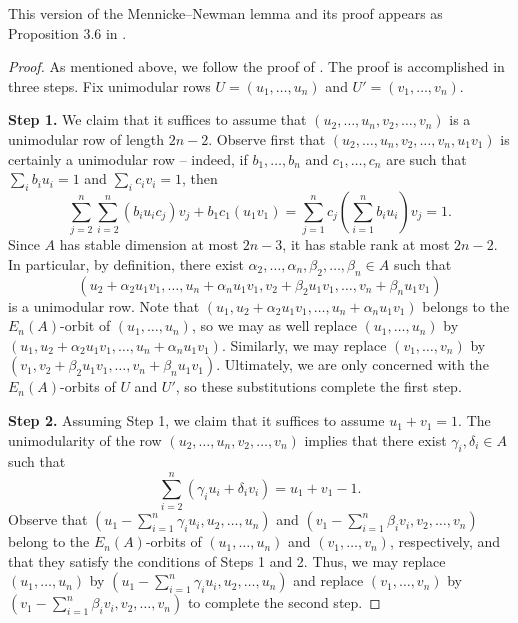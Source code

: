 This version of the Mennicke--Newman lemma and its proof appears as Proposition 3.6 in \cite{LERBET2024109415}.

\begin{proof}
    As mentioned above, we follow the proof of \cite[Proposition 3.6]{LERBET2024109415}. The proof is accomplished in three steps. Fix unimodular rows $U = (u_1,\ldots,u_n)$ and $U' = (v_1,\ldots,v_n)$.

    \textbf{Step 1.} We claim that it suffices to assume that $(u_2,\ldots,u_n,v_2,\ldots,v_n)$ is a unimodular row of length $2n-2$. Observe first that $(u_2,\ldots,u_n,v_2,\ldots,v_n, u_1v_1)$ is certainly a unimodular row -- indeed, if $b_1,\ldots,b_n$ and $c_1,\ldots,c_n$ are such that $\sum_i b_iu_i = 1$ and $\sum_i c_iv_i = 1$, then \[\sum_{j=2}^n \sum_{i=2}^n (b_iu_ic_j)v_j + b_1c_1(u_1v_1)= \sum_{j=1}^n c_j\left(\sum_{i=1}^n b_iu_i\right)v_j =1. \]
    Since $A$ has stable dimension at most $2n-3$, it has stable rank at most $2n-2$. In particular, by definition, there exist $\alpha_2,\ldots,\alpha_n,\beta_2,\ldots,\beta_n \in A$ such that
    \[
    (u_2+\alpha_2u_1v_1, \ldots,u_n+\alpha_nu_1v_1,v_2+\beta_2u_1v_1,\ldots,v_n + \beta_nu_1v_1)
    \]
    is a unimodular row. Note that $(u_1,u_2+\alpha_2u_1v_1, \ldots,u_n+\alpha_nu_1v_1)$ belongs to the $E_n(A)$-orbit of $(u_1,\ldots,u_n)$, so we may as well replace $(u_1,\ldots,u_n)$ by $(u_1,u_2+\alpha_2u_1v_1, \ldots,u_n+\alpha_nu_1v_1)$. Similarly, we may replace $(v_1,\ldots,v_n)$ by $(v_1,v_2+\beta_2u_1v_1,\ldots,v_n + \beta_nu_1v_1)$. Ultimately, we are only concerned with the $E_n(A)$-orbits of $U$ and $U'$, so these substitutions complete the first step. 

    \textbf{Step 2.} Assuming Step 1, we claim that it suffices to assume $u_1 + v_1 = 1$. The unimodularity of the row $(u_2,\ldots,u_n,v_2,\ldots,v_n)$ implies that there exist $\gamma_i,\delta_i \in A$ such that
    \[
    \sum_{i=2}^n (\gamma_iu_i + \delta_iv_i) = u_1 + v_1 - 1.
    \]
    Observe that $\left(u_1-\sum_{i=1}^n\gamma_iu_i, u_2,\ldots,u_n\right)$ and $\left(v_1-\sum_{i=1}^n\beta_iv_i, v_2,\ldots,v_n\right)$ belong to the $E_n(A)$-orbits of $(u_1,\ldots,u_n)$ and $(v_1,\ldots,v_n)$, respectively, and that they satisfy the conditions of Steps 1 and 2. Thus, we may replace $(u_1,\ldots,u_n)$ by $\left(u_1-\sum_{i=1}^n\gamma_iu_i, u_2,\ldots,u_n\right)$ and replace $(v_1,\ldots,v_n)$ by $\left(v_1-\sum_{i=1}^n\beta_iv_i, v_2,\ldots,v_n\right)$ to complete the second step. 


\end{proof}
